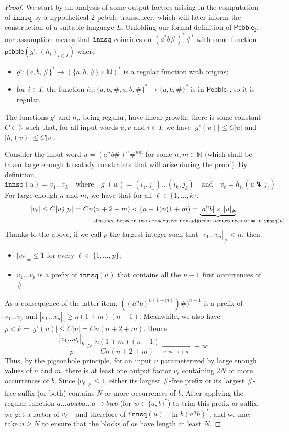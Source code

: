 \documentclass{fundam}
\newcommand{\bbN}{\mathbb{N}}
\newcommand{\pebble}{\mathsf{pebble}}
\newcommand{\Pebble}{\mathsf{Pebble}}
\theoremstyle{claimstyle}
\newcommand\withul{\lightning}
\newcommand\innsq{\mathtt{innsq}}
\begin{document}
\begin{proof}
  We start by an analysis of some output factors arising in the computation of $\innsq$ by a hypothetical 2-pebble transducer, which will later inform the
  construction of a suitable language $L$. Unfolding our formal definition of $\Pebble_2$, our assumption means that $\innsq$ coincides on $(a^*b\#)^*\#^*$
  with some function $\pebble(g^\circ,(h_i)_{i\in I})$ where
  \begin{itemize}
    \item $g^\circ \colon \{a,b,\#\}^{*} \to (\{a,b,\#\}\times\bbN)^{*}$ is a regular function with origins;
    \item for $i\in I$, the function $h_{i} \colon \{a,b,\#,\underline{a},\underline{b},\underline\#\}^{*} \to \{a,b,\#\}^*$ is in $\Pebble_1$, so it is regular.
  \end{itemize}
  The functions $g^\circ$ and $h_i$, being regular, have linear growth: there is
  some constant $C \in \mathbb{N}$ such that, for all input words $u,v$ and $i
  \in I$, we have $|g^\circ(u)| \le C|u|$ and $|h_i(v)| \le C|v|$.

  Consider the input word $u = (a^n b\#)^n \#^{nm}$ for some $n,m\in\bbN$ (which shall be taken large enough to satisfy constraints that will arise during the proof). By definition,
  \[ \innsq(u) = v_1 \dots v_k \quad
  \text{where} \quad g^\circ(w) = (i_{1}, j_1) \dots (i_{k},j_{k})
  \quad\text{and}\quad v_\ell = h_{i_{\ell}}(u\withul j_{\ell}) \]
    For large enough $n$ and $m$, we have that for all $\ell \in \{1,\dots,k\}$,
\[ |v_\ell| \leq C|u\withul j_\ell| = Cn(n+2+m) < (n+1)n(1+m) =
\underbrace{|a^n b| \times |u|_\#}_{\mathclap{\text{distance between two consecutive non-adjacent occurrences of $\#$ in $\innsq(u)$}\qquad\qquad\qquad\qquad}} \]
Thanks to the above, if we call $p$ the largest integer such that $|v_1 \dots v_p|_\# < n$, then:
\begin{itemize}
  \item $|v_\ell|_\# \leq 1$ for every $\ell \in \{1,\dots,p\}$;
  \item $v_1 \dots v_p$ is a prefix of $\innsq(u)$ that contains all the $n-1$ first occurrences of $\#$.
\end{itemize}
As a consequence of the latter item,
$((a^n b)^{n(1+m)})\#)^{n-1}$ is a prefix of $v_1 \dots v_p$ and 
  $|v_1 \dots v_p|_b \ge n(1+m)(n-1)$. Meanwhile, we also have $p < k = |g^\circ(u)| \leq C|u| = Cn(n + 2 + m)$. Hence
\[ \frac{|v_1 \dots v_p|_b}{p} \geq \frac{n(1+m)(n-1)}{Cn(n+2+m)} \xrightarrow[~n,m \to +\infty~]{} +\infty \]
Thus, by the pigeonhole principle, for an input $u$ parameterized by large
enough values of $n$ and $m$, there is at least one output factor $v_\ell$
containing $2N$ or more occurrences of $b$. Since $|v_\ell|_\# \leq 1$, either
its largest $\#$-free prefix or its largest $\#$-free suffix (or both) contains
$N$ or more occurrences of $b$. After applying the regular function $a\dots abwba \dots a \mapsto bwb$ (for $w \in \{a,b\}^*$) to trim this prefix or suffix, we get a factor of $v_\ell$ -- and therefore of $\innsq(u)$ -- in $b(a^n b)^*$, and we may take $n \geq N$ to ensure that the blocks of $a$s have length at least $N$.


\end{proof}
\end{document}
